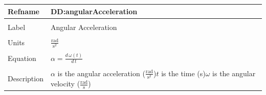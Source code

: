 \documentclass[12pt]{article}
\begin{document}
\noindent \begin{minipage}{\textwidth}
\begin{tabular}{p{} p{}}
\toprule \textbf{Refname} & \textbf{DD:angularAcceleration}
\label{DD:angularAcceleration}
\\ \midrule \\
Label & Angular Acceleration
\\ \midrule \\
Units & $\frac{\text{rad}}{\text{s}^{2}}$
\\ \midrule \\
Equation & $α=\frac{d\,ω\left(t\right)}{d\,t}$
\\ \midrule \\
Description & $α$ is the angular acceleration ($\frac{\text{rad}}{\text{s}^{2}}$)\newline$t$ is the time (s)\newline$ω$ is the angular velocity ($\frac{\text{rad}}{\text{s}}$)
\\ \bottomrule \end{tabular}
\end{minipage}\\
~\newline
\end{document}
